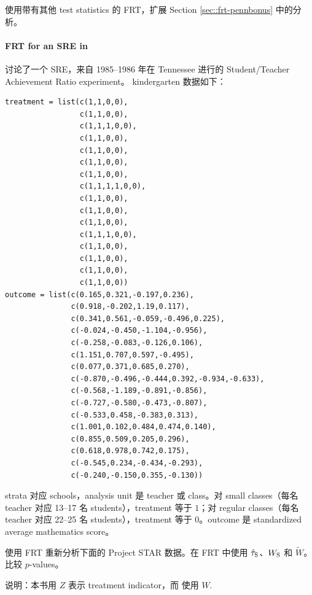  使用带有其他 test statistics 的 FRT，扩展 Section \ref{sec::frt-pennbonus} 中的分析。


 
 \paragraph{FRT for an SRE in \citet{imbens2015causal}}


\citet{imbens2015causal} 讨论了一个 SRE，来自 1985--1986 年在 Tennessee 进行的 Student/Teacher Achievement Ratio experiment。
kindergarten 数据如下：
 \begin{lstlisting}
treatment = list(c(1,1,0,0), 
                 c(1,1,0,0), 
                 c(1,1,1,0,0), 
                 c(1,1,0,0),
                 c(1,1,0,0),
                 c(1,1,0,0),
                 c(1,1,0,0), 
                 c(1,1,1,1,0,0),
                 c(1,1,0,0),
                 c(1,1,0,0),
                 c(1,1,0,0),
                 c(1,1,1,0,0),
                 c(1,1,0,0),
                 c(1,1,0,0),
                 c(1,1,0,0),
                 c(1,1,0,0))
outcome = list(c(0.165,0.321,-0.197,0.236), 
               c(0.918,-0.202,1.19,0.117),
               c(0.341,0.561,-0.059,-0.496,0.225),
               c(-0.024,-0.450,-1.104,-0.956), 
               c(-0.258,-0.083,-0.126,0.106),
               c(1.151,0.707,0.597,-0.495), 
               c(0.077,0.371,0.685,0.270), 
               c(-0.870,-0.496,-0.444,0.392,-0.934,-0.633), 
               c(-0.568,-1.189,-0.891,-0.856), 
               c(-0.727,-0.580,-0.473,-0.807), 
               c(-0.533,0.458,-0.383,0.313), 
               c(1.001,0.102,0.484,0.474,0.140), 
               c(0.855,0.509,0.205,0.296), 
               c(0.618,0.978,0.742,0.175), 
               c(-0.545,0.234,-0.434,-0.293), 
               c(-0.240,-0.150,0.355,-0.130))
\end{lstlisting}
strata 对应 schools，analysis unit 是 teacher 或 class。对 small classes（每名 teacher 对应 13--17 名 students），treatment 等于 $1$；对 regular classes（每名 teacher 对应 22--25 名 students），treatment 等于 $0$。outcome 是 standardized average mathematics score。


使用 FRT 重新分析下面的 Project STAR 数据。在 FRT 中使用 $\hat{\tau}_\textsc{S}$、$W_\textsc{S}$ 和 $\tilde W$。比较 $p$-values。

说明：本书用 $Z$ 表示 treatment indicator，而 \citet{imbens2015causal} 使用 $W.$
 






